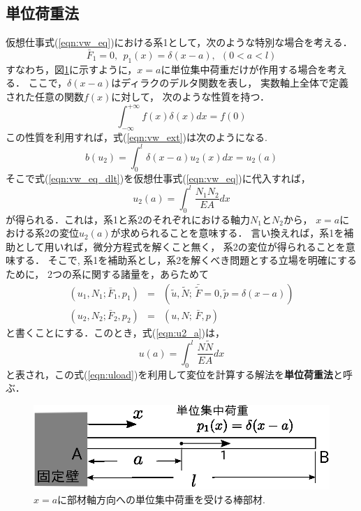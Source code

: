 \documentclass[10pt,a4j]{jarticle}
\begin{document}
\subsection{単位荷重法}
仮想仕事式(\ref{eqn:vw_eq})における系1として，次のような特別な場合を考える．
\begin{equation}
	\bar F_1=0, \ \ p_1(x)=\delta(x-a), \ \ (0<a<l)
	\label{eqn:sys1}
\end{equation}
すなわち，図\ref{fig:fig1_3}に示すように，$x=a$に単位集中荷重だけが作用する場合を考える．
ここで，$\delta(x-a)$はディラクのデルタ関数を表し，
実数軸上全体で定義された任意の関数$f(x)$に対して，
次のような性質を持つ．
\begin{equation}
	\int_{-\infty}^{+\infty} f(x) \delta(x)dx =f(0)
	\label{eqn:dlt_sampling}
\end{equation}
この性質を利用すれば，式(\ref{eqn:vw_ext})は次のようになる. 
\begin{equation}
	b(u_2)=\int_0^l \delta(x-a)u_2(x)dx= u_2(a)
	\label{eqn:vw_eq_dlt}
\end{equation}
そこで式(\ref{eqn:vw_eq_dlt})を仮想仕事式(\ref{eqn:vw_eq})に代入すれば，
\begin{equation}
	u_2(a)=\int_0^l \frac{N_1N_2}{EA}dx
	\label{eqn:u2_a}
\end{equation}
が得られる．これは，系1と系2のそれぞれにおける軸力$N_1$と$N_2$から，
$x=a$における系2の変位$u_2(a)$が求められることを意味する．
言い換えれば，系1を補助として用いれば，微分方程式を解くこと無く，
系2の変位が得られることを意味する．
そこで, 系1を補助系とし，系2を解くべき問題とする立場を明確にするために，
2つの系に関する諸量を，あらためて 
\begin{eqnarray}
	\left( u_1, N_1; \bar F_1, p_1 \right)& = &
		\left(\tilde u, \tilde N;\, \bar{\tilde{F}}=0, \tilde p= \delta(x-a) \right) 
	\label{eqn:aux}
	\\
	\left( u_2, N_2; \bar F_2, p_2 \right)& = &
		\left( u,  N;\, \bar F, p \right) 
	\label{eqn:prb}
\end{eqnarray}
と書くことにする．このとき，式(\ref{eqn:u2_a})は，
\begin{equation}
	u(a)=\int_0^l \frac{N \tilde N}{EA}dx
	\label{eqn:uload}
\end{equation}
と表され，この式(\ref{eqn:uload})を利用して変位を計算する解法を{\bf 単位荷重法}と呼ぶ．
\begin{figure}[h]
	\begin{center}
	\includegraphics[width=0.4\linewidth]{fig1_3.eps} 
	\end{center}
	\caption{$x=a$に部材軸方向への単位集中荷重を受ける棒部材.} 
	\label{fig:fig1_3}
\end{figure}
%
\end{document}
